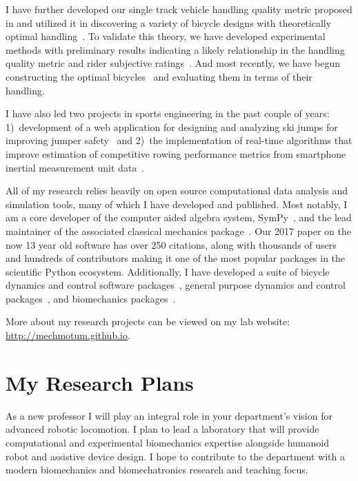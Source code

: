 \documentclass{article}
\begin{document}
I have further developed our single track vehicle handling quality metric
proposed in \cite{Hess2012} and utilized it in discovering a variety of bicycle
designs with theoretically optimal handling~\cite{Moore2016,Moore2019a}. To
validate this theory, we have developed experimental methods with preliminary
results indicating a likely relationship in the handling quality metric and
rider subjective ratings~\cite{Kresie2017}. And most recently, we have begun
constructing the optimal bicycles~\cite{Gilboa2019a} and evaluating them in
terms of their handling.

I have also led two projects in sports engineering in the past couple of years:
1)~development of a web application for designing and analyzing ski jumps for
improving jumper safety~\cite{Moore2018a,Cloud2019a} and 2)~the implementation
of real-time algorithms that improve estimation of competitive rowing
performance metrics from smartphone inertial measurement unit
data~\cite{Cloud2019b}.

All of my research relies heavily on open source computational data analysis
and simulation tools, many of which I have developed and published. Most
notably, I am a core developer of the computer aided algebra system,
SymPy~\cite{SymPyDevelopmentTeam2006}, and the lead maintainer of the
associated classical mechanics package~\cite{Gede2013}. Our 2017 paper
\cite{Meurer2017} on the now 13 year old software has over 250 citations, along
with thousands of users and hundreds of contributors making it one of the most
popular packages in the scientific Python ecosystem. Additionally, I have
developed a suite of bicycle dynamics and control software
packages~\cite{Moore2010b,Moore2011d,Moore2011a,Moore2011e}, general purpose
dynamics and control packages~\cite{Moore2014,Moore2011}, and biomechanics
packages~\cite{Dembia2011,Moore2011,Moore2011b,Moore2013b}.

More about my research projects can be viewed on my lab website:
\url{http://mechmotum.github.io}.

\section*{My Research Plans%
  \label{my-research-plans}%
}

As a new professor I will play an integral role in your department's vision for
advanced robotic locomotion. I plan to lead a laboratory that will provide
computational and experimental biomechanics expertise alongside humanoid robot
and assistive device design. I hope to contribute to the department with a
modern biomechanics and biomechatronics research and teaching focus.
\end{document}
